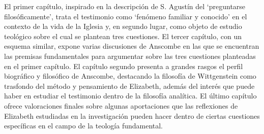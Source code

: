 El primer capítulo, inspirado en la descripción de S. Agustín del `preguntarse filosóficamente', trata el testimonio como `fenómeno familiar y conocido' en el contexto de la vida de la Iglesia y, en segundo lugar, como objeto de estudio teológico sobre el cual se plantean tres cuestiones. El tercer capítulo, con un esquema similar, expone varias discusiones de Anscombe en las que se encuentran las premisas fundamentales para argumentar sobre las tres cuestiones planteadas en el primer capítulo. El capítulo segundo presenta a grandes rasgos el perfil biográfico y filosófico de Anscombe, destacando la filosofía de Wittgenstein como trasfondo del método y pensamiento de Elizabeth, además del interés que puede haber en estudiar el testimonio dentro de la filosofía analítica. El último capítulo ofrece valoraciones finales sobre algunas aportaciones que las reflexiones de Elizabeth estudiadas en la investigación pueden hacer dentro de ciertas cuestiones específicas en el campo de la teología fundamental.
